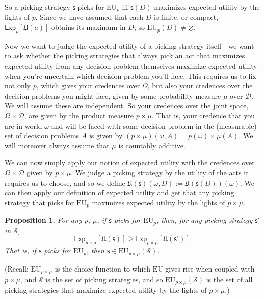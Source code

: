 \documentclass[a4paper]{article}
\newtheorem{proposition}[theorem]{Proposition}
\newcommand\D{\mathcal{D}}
\renewcommand\S{\mathcal{S}}
\newcommand\s{\mathsf{s}}
\newcommand\Exp{\mathsf{Exp}}
\newcommand\EU{\mathrm{EU}}
\newcommand\U{\mathfrak{U}} %
\renewcommand{\color}[1]{}
\newcommand{\Strategies}{\mathcal{S}}
\renewcommand{\emptyset}{\varnothing}
\renewcommand{\geq}{\geqslant}
\newenvironment{CCM rewritten}
{\begingroup\color{blue}} %
{\endgroup}              %
\begin{document}

So a picking strategy $\s$ picks for $\EU_p$ iff $\s(D)$ maximizes expected utility by the lights of $p$.
Since we have assumed that each $D$ is finite, or compact, $\Exp_p[\U(a)]$ obtains its maximum in $D$; so $\EU_p(D)\neq\emptyset$. 

Now we want to judge the expected utility of a picking strategy itself---we want to ask whether the picking strategies that always pick an act that maximizes expected utility from any decision problem themselves maximize expected utility when you're uncertain which decision problem you'll face. This requires us to fix not only $p$, which gives your credences over $\Omega$, but also your credences over the decision problems you might face, given by some probability measure $\mu$ over $\D$. We will assume these are independent. %
{So your credences over the joint space, $\Omega\times\D$, are given by the product measure $p\times\mu$. That is, your credence that you are in world $\omega$ and will be faced with some decision problem in the (measurable) set of decision problems $A$ is given by $(p\times\mu)(\omega,A)=p(\omega)\times\mu(A)$.} 
{\color{blue}We will moreover always assume that $\mu$ is countably additive. }


We can now simply apply our notion of expected utility with the credences over $\Omega\times\D$ given by %
{ $p\times\mu$.} We judge a picking strategy by the utility of the acts it requires us to choose, and so we define $\U(\s)(\omega,D):=\U(\s(D))(\omega)$. We can then apply our definition of expected utility and get that any picking strategy that picks for $\EU_p$ maximizes expected utility by the lights of %
{ $p\times\mu$.}
\begin{proposition}\label{thm:eu-self-rec}
	For any $p$, $\mu$, if $\s$ picks for $\EU_p$, then, for any picking strategy $\s'$ in $\S$,
	$$\Exp_{p\times\mu}[\U(\s)]\geq\Exp_{p\times\mu}[\U(\s')].$$
	That is, if $\s$ picks for $\EU_p$, then $\s\in\EU_{p\times\mu}(\Strategies)$. 
	\end{proposition}
(Recall: $\EU_{p\times \mu}$ is the choice function to which $\EU$ gives rise when coupled with %
{ $p\times\mu$}, and $\Strategies$ is the set of picking strategies, and so $\EU_{p\times \mu}(\Strategies)$ is the set of all picking strategies that maximize expected utility by the lights of %
{ $p\times\mu$.})
\end{document}
